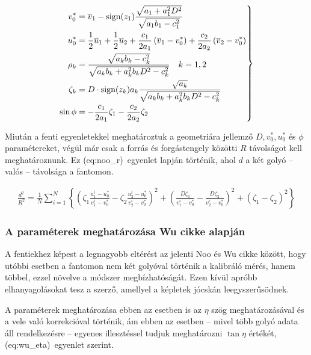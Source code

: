 \documentclass[a4paper,12pt]{article}
\begin{document}
\begin{equation}
\label{eq:noo_tobbi}
\left.
\begin{split}
v_0^* &= \overline{v}_1 - \text{sign} (z_1) \frac {\sqrt{a_1 + a_1^2D^2    }}{\sqrt{a_1b_1-c_1^2}}\\
u_0^* &= \frac{1}{2} \overline{u}_1  + \frac{1}{2} \overline{u}_2 + \frac{c_1}{2a_1} \left ( \overline{v}_1 - v_0^* \right) + \frac{c_2}{2a_2} \left (\overline{v}_2 - v_0^* \right)\\
\rho_k &= \frac{\sqrt{a_kb_k-c_k^2}}{\sqrt{a_kb_k+a_k^2b_kD^2-c_k^2}}  \hskip10pt k = 1,2\\
\zeta_k &= D \cdot \text{sign}(z_k)a_k \frac{\sqrt{a_k}}{\sqrt{a_kb_k+a_k^2b_kD^2-c_k^2}}\\
\sin \phi & = -\frac{c_1}{2a_1}  \zeta_1 - \frac{c_2}{2a_2} \zeta_2
\end{split}
\right \}
\end{equation}


Miután a fenti egyenletekkel meghatároztuk a geometriára jellemző $D, v_0^*, u_0^*$ és $\phi$ paramétereket, végül már csak a forrás és forgástengely közötti $R$ távolságot kell meghatároznunk. Ez \aref({eq:noo_r})~egyenlet lapján történik, ahol $d$ a két golyó -- valós -- távolsága a fantomon.

\begin{equation}
\label{eq:noo_r}
\begin{split}
\frac{d^2}{R^2} = \frac{1}{N} \sum_{i=1}^{N} \left\{ \left ( \zeta_1 \frac{u_1^i - u_0^*}{v_1^i - v_0^*}  - \zeta_2 \frac{u_2^i - u_0^*}{v_2^i - v_0^*} \right)^2 + \left( \frac{D \zeta_1}{v_1^i - v_0^*} - \frac{D \zeta_2}{v_2^i - v_0^*} \right)^2 + \left ( \zeta_1 - \zeta_2 \right) ^2 \right\}
\end{split}
\end{equation}


\subsubsection{A paraméterek meghatározása Wu \cite{wu} cikke alapján}
\label{sec:wu}


A fentiekhez képest a legnagyobb eltérést az jelenti Noo és Wu cikke között, hogy utóbbi esetben a fantomon nem két golyóval történik a kalibráló mérés, hanem többel, ezzel növelve a módszer megbízhatóságát. Ezen kívül apróbb elhanyagolásokat tesz a szerző, amellyel a képletek jócskán leegyszerűsödnek. 

A paraméterek meghatározása ebben az esetben is az $\eta$ szög meghatározásával és a vele való korrekcióval történik, ám ebben az esetben -- mivel több golyó adata áll rendelkezésre -- egyenes illesztéssel tudjuk meghatározni $\tan \eta$ értékét, \aref({eq:wu_eta})~egyenlet szerint.
\end{document}
